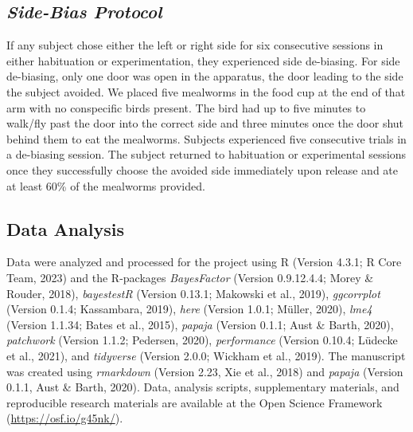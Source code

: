\documentclass[
  ,pub,floatsintext]{apa6}
\begin{document}
\hypertarget{side-bias-protocol-1}{%
\subsection{\texorpdfstring{\emph{Side-Bias Protocol}}{Side-Bias Protocol}}\label{side-bias-protocol-1}}

If any subject chose either the left or right side for six consecutive sessions in either habituation or experimentation, they experienced side de-biasing. For side de-biasing, only one door was open in the apparatus, the door leading to the side the subject avoided. We placed five mealworms in the food cup at the end of that arm with no conspecific birds present. The bird had up to five minutes to walk/fly past the door into the correct side and three minutes once the door shut behind them to eat the mealworms. Subjects experienced five consecutive trials in a de-biasing session. The subject returned to habituation or experimental sessions once they successfully choose the avoided side immediately upon release and ate at least 60\% of the mealworms provided.

\hypertarget{data-analysis}{%
\subsection{Data Analysis}\label{data-analysis}}

Data were analyzed and processed for the project using R (Version 4.3.1; R Core Team, 2023) and the R-packages \emph{BayesFactor} (Version 0.9.12.4.4; Morey \& Rouder, 2018), \emph{bayestestR} (Version 0.13.1; Makowski et al., 2019), \emph{ggcorrplot} (Version 0.1.4; Kassambara, 2019), \emph{here} (Version 1.0.1; Müller, 2020), \emph{lme4} (Version 1.1.34; Bates et al., 2015), \emph{papaja} (Version 0.1.1; Aust \& Barth, 2020), \emph{patchwork} (Version 1.1.2; Pedersen, 2020), \emph{performance} (Version 0.10.4; Lüdecke et al., 2021), and \emph{tidyverse} (Version 2.0.0; Wickham et al., 2019). The manuscript was created using \emph{rmarkdown} (Version 2.23, Xie et al., 2018) and \emph{papaja} (Version 0.1.1, Aust \& Barth, 2020). Data, analysis scripts, supplementary materials, and reproducible research materials are available at the Open Science Framework (\url{https://osf.io/g45nk/}).
\end{document}
